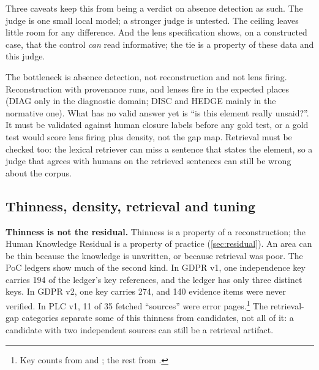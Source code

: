 Three caveats keep this from being a verdict on absence detection as such. The judge is one small
local model; a stronger judge is untested. The ceiling leaves little room for any difference. And the
lens specification shows, on a constructed case, that the control \emph{can} read informative; the
tie is a property of these data and this judge.

\begin{evintbox}
  The bottleneck is absence detection, not reconstruction and not lens firing. Reconstruction with
  provenance runs, and lenses fire in the expected places (DIAG only in the diagnostic domain; DISC
  and HEDGE mainly in the normative one). What has no valid answer yet is \enquote{is this element
  really unsaid?}. It must be validated against human closure labels before any gold test, or a gold
  test would score lens firing plus density, not the gap map. Retrieval must be checked too: the
  lexical retriever can miss a sentence that states the element, so a judge that agrees with humans
  on the retrieved sentences can still be wrong about the corpus.
\end{evintbox}

\subsection{Thinness, density, retrieval and tuning}\label{sec:interp-constructs}
\label{sec:interp-density}\label{sec:interp-stability}\label{sec:interp-tuning}

\textbf{Thinness is not the residual.} Thinness is a property of a reconstruction; the Human
Knowledge Residual is a property of practice (\cref{sec:residual}). An area can be thin because the
knowledge is unwritten, or because retrieval was poor. \evobs{} The PoC ledgers show much of the second kind. In GDPR v1, one
independence key carries 194 of the ledger's key references, and the ledger has only three distinct
keys. In GDPR v2, one key carries 274, and 140 evidence items were never verified. In PLC v1, 11 of 35
fetched \enquote{sources} were error pages.\footnote{Key counts from
 and
; the rest from
.} \evint{} The retrieval-gap categories separate some of this
thinness from candidates, not all of it: a candidate with two independent sources can still be a
retrieval artifact.

